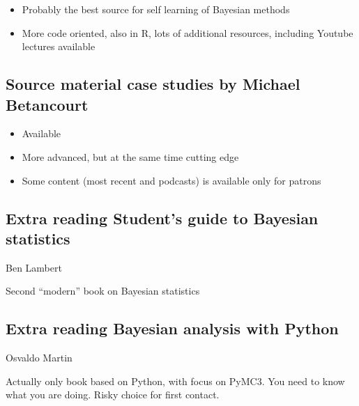 \documentclass[letterpaper,10pt,english]{jupyterBook}
\begin{document}
\begin{itemize}
\item {} 
\sphinxAtStartPar
Probably the best source for self learning of Bayesian methods

\item {} 
\sphinxAtStartPar
More code oriented, also in R, lots of additional resources, including Youtube lectures available 

\end{itemize}


\subsection{Source material \sphinxhyphen{} case studies by Michael Betancourt}
\label{\detokenize{Lecture 1:source-material-case-studies-by-michael-betancourt}}\begin{itemize}
\item {} 
\sphinxAtStartPar
Available 

\item {} 
\sphinxAtStartPar
More advanced, but at the same time cutting edge

\item {} 
\sphinxAtStartPar
Some content (most recent and podcasts) is available only for patrons

\end{itemize}


\subsection{Extra reading \sphinxhyphen{} Student’s guide to Bayesian statistics}
\label{\detokenize{Lecture 1:extra-reading-student-s-guide-to-bayesian-statistics}}
\sphinxAtStartPar
Ben Lambert



\sphinxAtStartPar
Second “modern” book on Bayesian statistics


\subsection{Extra reading \sphinxhyphen{} Bayesian analysis with Python}
\label{\detokenize{Lecture 1:extra-reading-bayesian-analysis-with-python}}
\sphinxAtStartPar
Osvaldo Martin



\sphinxAtStartPar
Actually only book based on Python, with focus on PyMC3. You need to know what you are doing. Risky choice for first contact.
\end{document}
